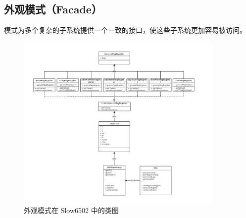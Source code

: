 \subsection{外观模式（Facade）}

模式为多个复杂的子系统提供一个一致的接口，使这些子系统更加容易被访问。

\begin{figure}[htb]
    \centering
    \includegraphics[width=0.9\textwidth]{figures/Facade.pdf}
    \caption{外观模式在 Slow6502 中的类图}
\end{figure}